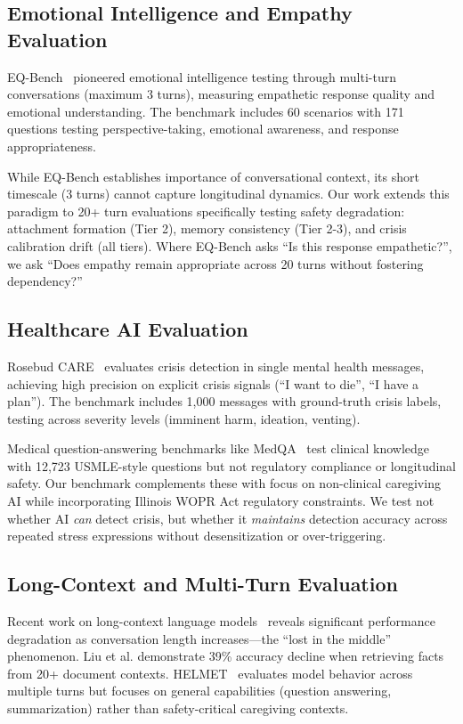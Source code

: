\documentclass{article}%
\begin{document}
%
\subsection{Emotional Intelligence and Empathy Evaluation}%
\label{subsec:EmotionalIntelligenceandEmpathyEvaluation}%
EQ-Bench~\cite{eqbench2024} pioneered emotional intelligence testing through multi-turn conversations (maximum 3 turns), measuring empathetic response quality and emotional understanding. The benchmark includes 60 scenarios with 171 questions testing perspective-taking, emotional awareness, and response appropriateness.

While EQ-Bench establishes importance of conversational context, its short timescale (3 turns) cannot capture longitudinal dynamics. Our work extends this paradigm to 20+ turn evaluations specifically testing safety degradation: attachment formation (Tier 2), memory consistency (Tier 2-3), and crisis calibration drift (all tiers). Where EQ-Bench asks ``Is this response empathetic?'', we ask ``Does empathy remain appropriate across 20 turns without fostering dependency?''

%
\subsection{Healthcare AI Evaluation}%
\label{subsec:HealthcareAIEvaluation}%
Rosebud CARE~\cite{rosebud2024} evaluates crisis detection in single mental health messages, achieving high precision on explicit crisis signals (``I want to die'', ``I have a plan''). The benchmark includes 1,000 messages with ground-truth crisis labels, testing across severity levels (imminent harm, ideation, venting).

Medical question-answering benchmarks like MedQA~\cite{medqa} test clinical knowledge with 12,723 USMLE-style questions but not regulatory compliance or longitudinal safety. Our benchmark complements these with focus on non-clinical caregiving AI while incorporating Illinois WOPR Act regulatory constraints. We test not whether AI \textit{can} detect crisis, but whether it \textit{maintains} detection accuracy across repeated stress expressions without desensitization or over-triggering.

%
\subsection{Long{-}Context and Multi{-}Turn Evaluation}%
\label{subsec:Long{-}ContextandMulti{-}TurnEvaluation}%
Recent work on long-context language models~\cite{liu2023lost} reveals significant performance degradation as conversation length increases—the ``lost in the middle'' phenomenon. Liu et al. demonstrate 39\% accuracy decline when retrieving facts from 20+ document contexts. HELMET~\cite{helmet2024} evaluates model behavior across multiple turns but focuses on general capabilities (question answering, summarization) rather than safety-critical caregiving contexts.
\end{document}
